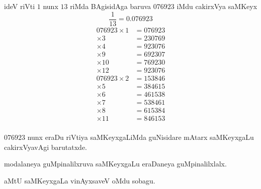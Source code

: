 ideV riVti $1$ nunx $13$ riMda BAgisidAga baruva $076923$ iMdu cakirxVya saMKeyx
$$
\frac{1}{13} = 0.076923
$$
\begin{align*}
076923 \times 1 &= 076923 \\
       \times 3 &= 230769 \\ 
       \times 4 &= 923076 \\
       \times 9 &= 692307 \\ 
       \times 10 &= 769230 \\
       \times 12 &= 923076 \\[.3cm]
076923 \times 2 &= 153846 \\
       \times 5 &= 384615 \\
       \times 6 &= 461538 \\
       \times 7 &= 538461 \\
       \times 8 &= 615384 \\
       \times 11 &= 846153 \\
\end{align*}

$076923$ nunx eraDu riVtiya saMKeyxgaLiMda guNisidare mAtarx saMKeyxgaLu cakirxVyavAgi barutatxde.

modalaneya guMpinalilxruva saMKeyxgaLu eraDaneya guMpinalilxlalx.

aMtU saMKeyxgaLa vinAyxsaveV oMdu sobagu.
